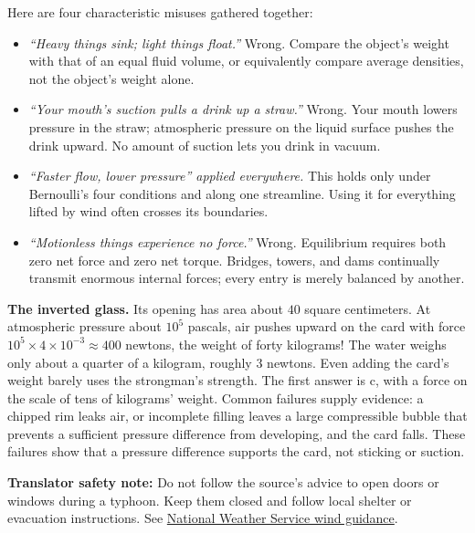 Here are four characteristic misuses gathered together:

\begin{itemize}[leftmargin=1.8em]
  \item \emph{``Heavy things sink; light things float.''} Wrong. Compare the object's weight with that of an equal fluid volume, or equivalently compare average densities, not the object's weight alone.
  \item \emph{``Your mouth's suction pulls a drink up a straw.''} Wrong. Your mouth lowers pressure in the straw; atmospheric pressure on the liquid surface pushes the drink upward. No amount of suction lets you drink in vacuum.
  \item \emph{``Faster flow, lower pressure'' applied everywhere.} This holds only under Bernoulli's four conditions and along one streamline. Using it for everything lifted by wind often crosses its boundaries.
  \item \emph{``Motionless things experience no force.''} Wrong. Equilibrium requires both zero net force and zero net torque. Bridges, towers, and dams continually transmit enormous internal forces; every entry is merely balanced by another.
\end{itemize}


\textbf{The inverted glass.} Its opening has area about \(40\) square centimeters. At atmospheric pressure about \(10^{5}\) pascals, air pushes upward on the card with force \(10^{5}\times4\times10^{-3}\approx 400\) newtons, the weight of forty kilograms! The water weighs only about a quarter of a kilogram, roughly \(3\) newtons. Even adding the card's weight barely uses the strongman's strength. The first answer is c, with a force on the scale of tens of kilograms' weight. Common failures supply evidence: a chipped rim leaks air, or incomplete filling leaves a large compressible bubble that prevents a sufficient pressure difference from developing, and the card falls. These failures show that a pressure difference supports the card, not sticking or suction.

\textbf{Translator safety note:} Do not follow the source's advice to open doors or windows during a typhoon. Keep them closed and follow local shelter or evacuation instructions. See \href{https://www.weather.gov/wrn/fall2019-wrw-sm}{National Weather Service wind guidance}.

